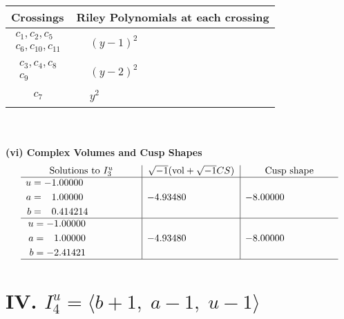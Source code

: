 \documentclass[1p]{elsarticle_modified}
\theoremstyle{definition}
\newcommand{\I}{\sqrt{-1}}
\begin{document}
\begin{tabular}{m{50pt}|m{274pt}}
Crossings & \hspace{64pt}Riley Polynomials at each crossing \\
\hline $$\begin{aligned}c_{1},c_{2},c_{5}\\c_{6},c_{10},c_{11}\end{aligned}$$&$\begin{aligned}
&(y-1)^2
\end{aligned}$\\
\hline $$\begin{aligned}c_{3},c_{4},c_{8}\\c_{9}\end{aligned}$$&$\begin{aligned}
&(y-2)^2
\end{aligned}$\\
\hline $$\begin{aligned}c_{7}\end{aligned}$$&$\begin{aligned}
&y^2
\end{aligned}$\\
\hline
\end{tabular}\\~\\
\newpage\flushleft \textbf{(vi) Complex Volumes and Cusp Shapes}
$$\begin{array}{c|c|c}  
\text{Solutions to }I^u_{3}& \I (\text{vol} + \sqrt{-1}CS) & \text{Cusp shape}\\
 \hline 
\begin{aligned}
u &= -1.00000\phantom{ +0.000000I} \\
a &= \phantom{-}1.00000\phantom{ +0.000000I} \\
b &= \phantom{-}0.414214\phantom{ +0.000000I}\end{aligned}
 & -4.93480\phantom{ +0.000000I} & -8.00000\phantom{ +0.000000I} \\ \hline\begin{aligned}
u &= -1.00000\phantom{ +0.000000I} \\
a &= \phantom{-}1.00000\phantom{ +0.000000I} \\
b &= -2.41421\phantom{ +0.000000I}\end{aligned}
 & -4.93480\phantom{ +0.000000I} & -8.00000\phantom{ +0.000000I}\\
 \hline 
 \end{array}$$\newpage\newpage\renewcommand{\arraystretch}{1}
\centering \section*{IV. $I^u_{4}= \langle b+1,\;a-1,\;u-1 \rangle$}
\end{document}
